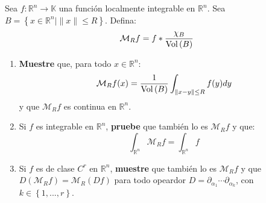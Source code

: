 \documentclass[12pt]{report}
\theoremstyle{largebreak}
\newcommand\cf[3]{\ensuremath{#1:#2\rightarrow#3}}
\newcommand{\Vol}[1]{\ensuremath{\textup{Vol}\left(#1\right)}}
\begin{document}
    \begin{excer}
        Sea $\cf{f}{\mathbb{R}^n}{\mathbb{K}}$ una función localmente integrable en $\mathbb{R}^n$. Sea $B=\left\{x\in\mathbb{R}^n\Big|\|x\|\leq R \right\}$. Defina:
        \begin{equation*}
            \mathcal{M}_Rf=f*\frac{\chi_B}{\Vol{B}}
        \end{equation*}
        \begin{enumerate}
            \item \textbf{Muestre} que, para todo $x\in\mathbb{R}^n$:
            \begin{equation*}
                \mathcal{M}_Rf(x)=\frac{1}{\Vol{B}}\int_{\|x-y\|\leq R}f(y)dy
            \end{equation*}
            y que $\mathcal{M}_Rf$ es continua en $\mathbb{R}^n$.
            \item Si $f$ es integrable en $\mathbb{R}^n$, \textbf{pruebe} que también lo es $\mathcal{M}_Rf$ y que:
            \begin{equation*}
                \int_{\mathbb{R}^n}\mathcal{M}_Rf=\int_{\mathbb{R}^n}f
            \end{equation*}
            \item Si $f$ es de clase $C^r$ en $\mathbb{R}^n$, \textbf{muestre} que también lo es $\mathcal{M}_Rf$ y que $D(\mathcal{M}_Rf)=\mathcal{M}_R(Df)$ para todo opeardor $D=\partial_{\alpha_1}\cdots\partial_{\alpha_k}$, con $k\in\left\{1,...,r \right\}$.
        \end{enumerate}
    \end{excer}
    
    \begin{sol}
        
    \end{sol}
\end{document}

